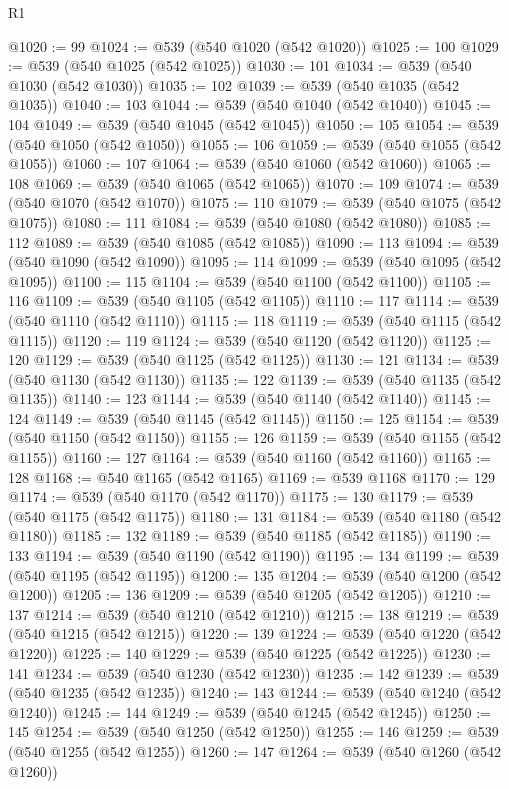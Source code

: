 \begin{lexlean}{R1}
\begin{coremodule}
{{{{{{{{{{{{{{{{{{{{{{{{{{{{{{{{{{{{{{{{@1020 := 99
@1024 := @539 (@540 @1020 (@542 @1020))
@1025 := 100
@1029 := @539 (@540 @1025 (@542 @1025))
@1030 := 101
@1034 := @539 (@540 @1030 (@542 @1030))
@1035 := 102
@1039 := @539 (@540 @1035 (@542 @1035))
@1040 := 103
@1044 := @539 (@540 @1040 (@542 @1040))
@1045 := 104
@1049 := @539 (@540 @1045 (@542 @1045))
@1050 := 105
@1054 := @539 (@540 @1050 (@542 @1050))
@1055 := 106
@1059 := @539 (@540 @1055 (@542 @1055))
@1060 := 107
@1064 := @539 (@540 @1060 (@542 @1060))
@1065 := 108
@1069 := @539 (@540 @1065 (@542 @1065))
@1070 := 109
@1074 := @539 (@540 @1070 (@542 @1070))
@1075 := 110
@1079 := @539 (@540 @1075 (@542 @1075))
@1080 := 111
@1084 := @539 (@540 @1080 (@542 @1080))
@1085 := 112
@1089 := @539 (@540 @1085 (@542 @1085))
@1090 := 113
@1094 := @539 (@540 @1090 (@542 @1090))
@1095 := 114
@1099 := @539 (@540 @1095 (@542 @1095))
@1100 := 115
@1104 := @539 (@540 @1100 (@542 @1100))
@1105 := 116
@1109 := @539 (@540 @1105 (@542 @1105))
@1110 := 117
@1114 := @539 (@540 @1110 (@542 @1110))
@1115 := 118
@1119 := @539 (@540 @1115 (@542 @1115))
@1120 := 119
@1124 := @539 (@540 @1120 (@542 @1120))
@1125 := 120
@1129 := @539 (@540 @1125 (@542 @1125))
@1130 := 121
@1134 := @539 (@540 @1130 (@542 @1130))
@1135 := 122
@1139 := @539 (@540 @1135 (@542 @1135))
@1140 := 123
@1144 := @539 (@540 @1140 (@542 @1140))
@1145 := 124
@1149 := @539 (@540 @1145 (@542 @1145))
@1150 := 125
@1154 := @539 (@540 @1150 (@542 @1150))
@1155 := 126
@1159 := @539 (@540 @1155 (@542 @1155))
@1160 := 127
@1164 := @539 (@540 @1160 (@542 @1160))
@1165 := 128
@1168 := @540 @1165 (@542 @1165)
@1169 := @539 @1168
@1170 := 129
@1174 := @539 (@540 @1170 (@542 @1170))
@1175 := 130
@1179 := @539 (@540 @1175 (@542 @1175))
@1180 := 131
@1184 := @539 (@540 @1180 (@542 @1180))
@1185 := 132
@1189 := @539 (@540 @1185 (@542 @1185))
@1190 := 133
@1194 := @539 (@540 @1190 (@542 @1190))
@1195 := 134
@1199 := @539 (@540 @1195 (@542 @1195))
@1200 := 135
@1204 := @539 (@540 @1200 (@542 @1200))
@1205 := 136
@1209 := @539 (@540 @1205 (@542 @1205))
@1210 := 137
@1214 := @539 (@540 @1210 (@542 @1210))
@1215 := 138
@1219 := @539 (@540 @1215 (@542 @1215))
@1220 := 139
@1224 := @539 (@540 @1220 (@542 @1220))
@1225 := 140
@1229 := @539 (@540 @1225 (@542 @1225))
@1230 := 141
@1234 := @539 (@540 @1230 (@542 @1230))
@1235 := 142
@1239 := @539 (@540 @1235 (@542 @1235))
@1240 := 143
@1244 := @539 (@540 @1240 (@542 @1240))
@1245 := 144
@1249 := @539 (@540 @1245 (@542 @1245))
@1250 := 145
@1254 := @539 (@540 @1250 (@542 @1250))
@1255 := 146
@1259 := @539 (@540 @1255 (@542 @1255))
@1260 := 147
@1264 := @539 (@540 @1260 (@542 @1260))
}}}}}}}}}}}}}}}}}}}}}}}}}}}}}}}}}}}}}}}}
\end{coremodule}
\end{lexlean}
